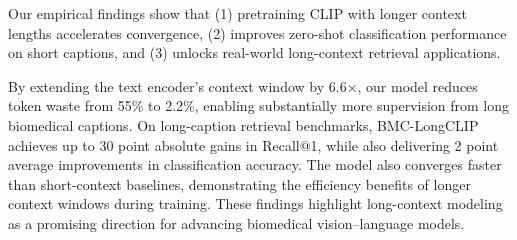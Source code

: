 Our empirical findings show that (1) pretraining CLIP with longer context lengths accelerates convergence, (2) improves zero-shot classification performance on short captions, and (3) unlocks real-world long-context retrieval applications. 

By extending the text encoder’s context window by 6.6×, our model reduces token waste from 55\% to 2.2\%, enabling substantially more supervision from long biomedical captions. On long-caption retrieval benchmarks, BMC-LongCLIP achieves up to 30 point absolute gains in Recall@1, while also delivering 2 point average improvements in classification accuracy. The model also converges faster than short-context baselines, demonstrating the efficiency benefits of longer context windows during training. These findings highlight long-context modeling as a promising direction for advancing biomedical vision–language models.










